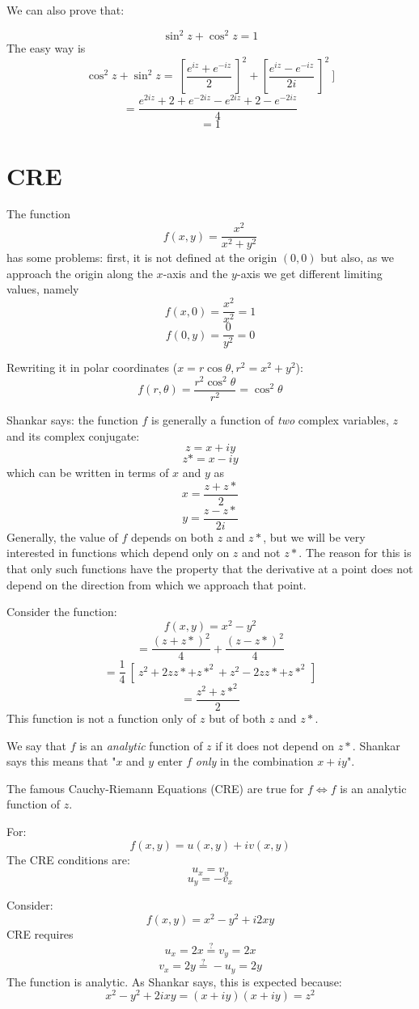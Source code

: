 \documentclass[11pt, oneside]{article}   	%
\begin{document}
We can also prove that:

\[ \sin^2 z + \cos^2 z = 1 \]
The easy way is
\[ \cos^2 z + \sin^2 z = \ [ \frac{e^{iz} + e^{-iz}}{2} \ ]^2 +  [ \frac{e^{iz} - e^{-iz}}{2i} \ ]^2 \ ] \]
\[= \frac{e^{2iz} + 2 + e^{-2iz} - e^{2iz} + 2 - e^{-2iz} }{4} \]
\[ = 1 \]

\section{CRE}
The function
\[ f(x,y) = \frac{x^2}{x^2 + y^2} \]
has some problems:  first, it is not defined at the origin $(0,0)$ but also, as we approach the origin along the $x$-axis and the $y$-axis we get different limiting values, namely
\[ f(x,0) = \frac{x^2}{x^2} = 1 \]
\[ f(0,y) = \frac{0}{y^2} = 0 \]

Rewriting it in polar coordinates ($x = r \cos \theta, r^2 = x^2 + y^2$):
\[ f(r,\theta) = \frac{r^2 \cos^2 \theta}{r^2} = \cos^2 \theta \]

Shankar says:  the function $f$ is generally a function of \emph{two} complex variables, $z$ and its complex conjugate:
\[ z = x + iy \]
\[ z* = x - iy \]
which can be written in terms of $x$ and $y$ as
\[ x = \frac{z + z*}{2} \]
\[ y = \frac{z - z*}{2i} \]
Generally, the value of $f$ depends on both $z$ and $z*$, but we will be very interested in functions which depend only on $z$ and not $z*$.  The reason for this is that only such functions have the property that the derivative at a point does not depend on the direction from which we approach that point.

Consider the function:
\[ f(x,y) = x^2 - y^2 \]
\[ = \frac{(z+z*)^2}{4} + \frac{(z-z*)^2}{4} \]
\[ = \frac{1}{4} \ [ \ z^2 + 2zz* + z*^2 + z^2 - 2zz* + z*^2 \ ] \]
\[ = \frac{z^2 + z*^2}{2} \]
This function is not a function only of $z$ but of both $z$ and $z*$.

We say that $f$ is an \emph{analytic} function of $z$ if it does not depend on $z*$.  Shankar says this means that "$x$ and $y$ enter $f$ \emph{only} in the combination $x + iy$".

The famous Cauchy-Riemann Equations (CRE) are true for $f \iff f$ is an analytic function of $z$.  

For:
\[ f(x,y) = u(x,y) + iv(x,y) \]
The CRE conditions are:
\[ u_x = v_y \]
\[ u_y = -v_x \]

Consider:
\[ f(x,y) = x^2 - y^2 + i2xy \]
CRE requires
\[ u_x = 2x \stackrel{?}{=}  v_y = 2x \]
\[ v_x = 2y \stackrel{?}{=} - u_y = 2y \]
The function is analytic.  As Shankar says, this is expected because:
\[ x^2 - y^2 + 2ixy = (x + iy)(x + iy) = z^2 \]
\end{document}
